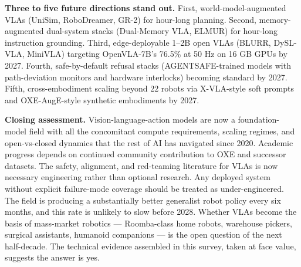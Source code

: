 \documentclass{article}
\begin{document}
\textbf{Three to five future directions stand out.} First, world-model-augmented VLAs (UniSim, RoboDreamer, GR-2) for hour-long planning. Second, memory-augmented dual-system stacks (Dual-Memory VLA, ELMUR) for hour-long instruction grounding. Third, edge-deployable 1--2B open VLAs (BLURR, DySL-VLA, MiniVLA) targeting OpenVLA-7B's 76.5\% at 50 Hz on 16 GB GPUs by 2027. Fourth, safe-by-default refusal stacks (AGENTSAFE-trained models with path-deviation monitors and hardware interlocks) becoming standard by 2027. Fifth, cross-embodiment scaling beyond 22 robots via X-VLA-style soft prompts and OXE-AugE-style synthetic embodiments by 2027.

\textbf{Closing assessment.} Vision-language-action models are now a foundation-model field with all the concomitant compute requirements, scaling regimes, and open-vs-closed dynamics that the rest of AI has navigated since 2020. Academic progress depends on continued community contribution to OXE and successor datasets. The safety, alignment, and red-teaming literature for VLAs is now necessary engineering rather than optional research. Any deployed system without explicit failure-mode coverage should be treated as under-engineered. The field is producing a substantially better generalist robot policy every six months, and this rate is unlikely to slow before 2028. Whether VLAs become the basis of mass-market robotics --- Roomba-class home robots, warehouse pickers, surgical assistants, humanoid companions --- is the open question of the next half-decade. The technical evidence assembled in this survey, taken at face value, suggests the answer is yes.



\end{document}
